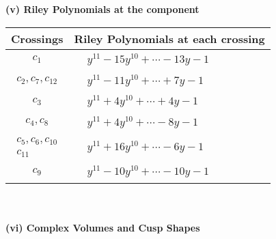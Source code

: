 \documentclass[1p]{elsarticle_modified}
\theoremstyle{definition}
\begin{document}
\newpage\renewcommand{\arraystretch}{1}
\flushleft \textbf{(v) Riley Polynomials at the component}\newline \\
\begin{tabular}{m{50pt}|m{274pt}}
Crossings & \hspace{64pt}Riley Polynomials at each crossing \\
\hline $$\begin{aligned}c_{1}\end{aligned}$$&$\begin{aligned}
&y^{11}-15 y^{10}+\cdots-13 y-1
\end{aligned}$\\
\hline $$\begin{aligned}c_{2},c_{7},c_{12}\end{aligned}$$&$\begin{aligned}
&y^{11}-11 y^{10}+\cdots+7 y-1
\end{aligned}$\\
\hline $$\begin{aligned}c_{3}\end{aligned}$$&$\begin{aligned}
&y^{11}+4 y^{10}+\cdots+4 y-1
\end{aligned}$\\
\hline $$\begin{aligned}c_{4},c_{8}\end{aligned}$$&$\begin{aligned}
&y^{11}+4 y^{10}+\cdots-8 y-1
\end{aligned}$\\
\hline $$\begin{aligned}c_{5},c_{6},c_{10}\\c_{11}\end{aligned}$$&$\begin{aligned}
&y^{11}+16 y^{10}+\cdots-6 y-1
\end{aligned}$\\
\hline $$\begin{aligned}c_{9}\end{aligned}$$&$\begin{aligned}
&y^{11}-10 y^{10}+\cdots-10 y-1
\end{aligned}$\\
\hline
\end{tabular}\\~\\
\newpage\flushleft \textbf{(vi) Complex Volumes and Cusp Shapes}
\end{document}
